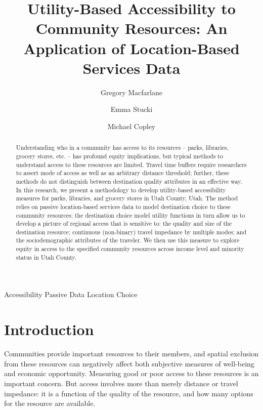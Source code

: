 \documentclass[3p, authoryear]{elsarticle} %
\begin{document}
\begin{frontmatter}

  \title{Utility-Based Accessibility to Community Resources: An Application of Location-Based Services Data}
    \author[BYU]{Gregory Macfarlane}
    \author[BYU]{Emma Stucki}
    \author[BYU]{Michael Copley}
  
    \author[]{}
  
  
  \begin{abstract}
  Understanding who in a community has access to its resources -- parks, libraries, grocery stores, etc. -- has profound equity implications, but typical methods to understand access to these resources are limited. Travel time buffers require researchers to assert mode of access as well as an arbitrary distance threshold; further, these methods do not distinguish between destination quality attributes in an effective way. In this research, we present a methodology to develop utility-based accessibility measures for parks, libraries, and grocery stores in Utah County, Utah. The method relies on passive location-based services data to model destination choice to these community resources; the destination choice model utility functions in turn allow us to develop a picture of regional access that is sensitive to: the quality and size of the destination resource; continuous (non-binary) travel impedance by multiple modes; and the sociodemographic attributes of the traveler. We then use this measure to explore equity in access to the specified community resources across income level and minority status in Utah County.
  \end{abstract}
   \begin{keyword} Accessibility Passive Data Location Choice\end{keyword}
 \end{frontmatter}

\hypertarget{intro}{%
\section{Introduction}\label{intro}}

Communities provide important resources to their members, and spatial exclusion
from these resources can negatively affect both subjective measures of well-being
\citep{currie2010modeling} and economic opportunity.
Measuring good or poor access to these resources is an important concern. But
access involves more than merely distance or travel impedance: it is a function
of the quality of the resource, and how many options for the resource are
available.
\end{document}

